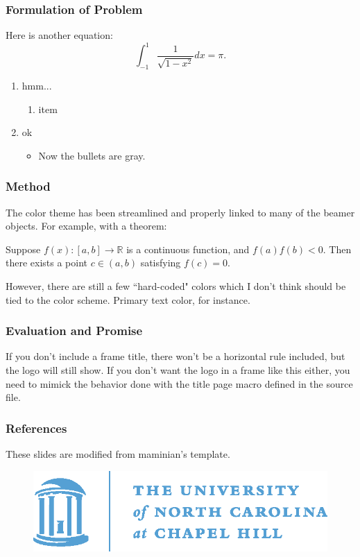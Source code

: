 \documentclass{beamer}
\begin{document}
\begin{frame}
\frametitle{Formulation of Problem}
Here is another equation:
%
\begin{equation}
\int_{-1}^1 \frac{1}{\sqrt{1-x^2}} dx = \pi.
\end{equation}

\begin{enumerate}
\item hmm...
    \begin{enumerate}
    \item item
    \end{enumerate}
\item ok
    \begin{itemize}
    \item Now the bullets are gray.
    \end{itemize}
\end{enumerate}

\end{frame}
%
\begin{frame}
\frametitle{Method}

The color theme has been streamlined and properly linked 
to many of the beamer objects. For example, with a 
theorem:

\begin{theorem}
Suppose $f(x) : [a,b] \to \mathbb{R}$ is a 
continuous function, and $f(a)f(b)<0$. Then 
there exists a point $c \in (a,b)$ satisfying 
$f(c)=0$.
\end{theorem}

However, there are still a few ``hard-coded" colors which 
I don't think should be tied to the color scheme. 
Primary text color, for instance.

\end{frame}
%
\begin{frame}
\frametitle{Evaluation and Promise}
If you don't include a frame title, there won't be a horizontal 
rule included, but the logo will still show. 
If you don't want the logo in a frame like this 
either, you need to mimick the behavior done with the 
title page macro defined in the source file.
\end{frame}
%
\begin{frame}
\frametitle{References}

These slides are modified from maminian's template\cite{UNCbeamer}.

%


\begin{figure}
\centering
\includegraphics[width=0.5\linewidth]{oldwell_cmyk}
\end{figure}
\end{frame}
%
\end{document}
